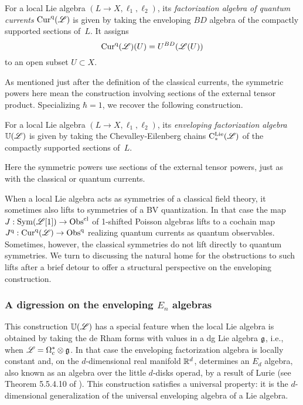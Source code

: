 \begin{dfn}
\label{dfn: quantum currents}
For a local Lie algebra $(L\to X, \ell_1,\ell_2)$, 
its {\em factorization algebra of quantum currents} ${\rm Cur}^{\rm q}(\mathscr L)$ is given by taking the enveloping $BD$   algebra of the compactly supported sections of~$L$.
It assigns
\[
{\rm Cur}^{\rm q}(\mathscr L)(U) = U^{BD}(\mathscr L(U))
\]
to an open subset $U \subset X$.
\end{dfn}

As mentioned just after the definition of the classical currents, 
the symmetric powers here mean the construction involving sections of the external tensor product.
Specializing $\hbar = 1$, we recover the following construction.

\begin{dfn}
For a local Lie algebra $(L\to X, \ell_1,\ell_2)$, 
its {\em enveloping factorization algebra} $\mathbb U(\mathscr L)$ is given by taking the Chevalley-Eilenberg chains ${\rm C}^{\rm Lie}_*(\mathscr L)$ of the compactly supported sections of~$L$.
\end{dfn}

Here the symmetric powers use sections of the external tensor powers, just as with the classical or quantum currents.

When a local Lie algebra acts as symmetries of a classical field theory,
it sometimes also lifts to symmetries of a BV quantization.
In that case the map $J: {\rm Sym}(\mathscr L[1]) \to {\rm Obs}^{\rm cl}$ of 1-shifted Poisson algebras lifts to a cochain map $J^{\rm q}: {\rm Cur}^{\rm q}(\mathscr L) \to {\rm Obs}^{\rm q}$ realizing quantum currents as quantum observables.
Sometimes, however, the classical symmetries do not lift directly to quantum symmetries.
We turn to discussing the natural home for the obstructions to such lifts after a brief detour to offer a structural perspective on the enveloping construction.

\subsubsection{A digression on the enveloping $E_n$ algebras}
\label{sec:knudsen}


This construction $\mathbb U(\mathscr L)$ has a special feature when the local Lie algebra is obtained by taking the de Rham forms with values in a dg Lie algebra $\mathfrak g$, i.e., when $\mathscr L = \Omega^*_c \otimes \mathfrak g$.
In that case the enveloping factorization algebra is locally constant and, on the $d$-dimensional real manifold $\mathbb R^d$, determines an $E_d$ algebra, also known as an algebra over the little $d$-disks operad, by a result of Lurie (see Theorem 5.5.4.10 of \cite{LurieHA}).
This construction satisfies a universal property: 
it is the $d$-dimensional generalization of the universal enveloping algebra of a Lie algebra.

